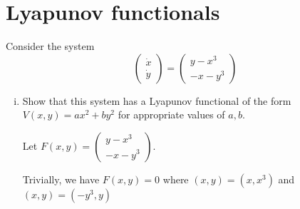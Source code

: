 \documentclass[12pt]{article}
\begin{document}
\section{Lyapunov functionals}

Consider the system
\[
    \begin{pmatrix} \dot{x} \\ \dot{y} \end{pmatrix} =
    \begin{pmatrix} y-x^3 \\ -x-y^3 \end{pmatrix}
\]
\begin{enumerate}[(i)]
    \item Show that this system has a Lyapunov functional of the form $V(x,y)=ax^2+by^2$ for appropriate values of $a,b$.

          \color{blue}
          Let $F(x, y) = \begin{pmatrix} y-x^3 \\ -x-y^3 \end{pmatrix}$.

          Trivially, we have $F(x, y) = 0$ where $(x, y) = (x, x^3)$ and $(x, y) = (-y^3, y)$

          \begin{center}
              \color{black}

          \end{center}


\end{enumerate}
\end{document}
